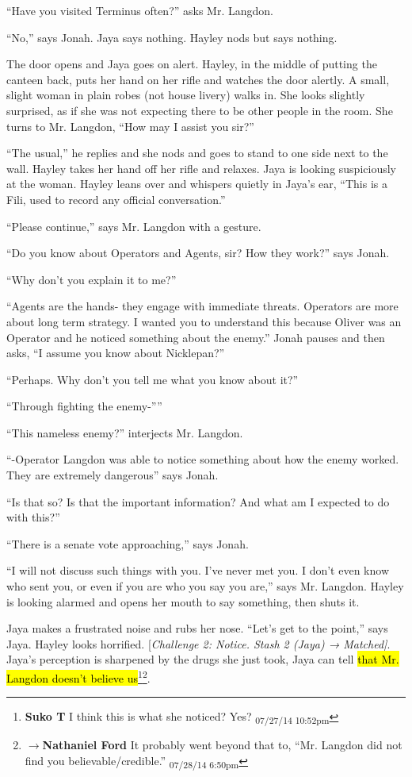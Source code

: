 ``Have you visited Terminus often?'' asks Mr. Langdon.

``No,'' says Jonah.  Jaya says nothing.  Hayley nods but says nothing.

The door opens and Jaya goes on alert.  Hayley, in the middle of putting the canteen back, puts her hand on her rifle and watches the door alertly.  A small, slight woman in plain robes (not house livery) walks in.  She looks slightly surprised, as if she was not expecting there to be other people in the room.  She turns to Mr. Langdon, ``How may I assist you sir?''

``The usual,'' he replies and she nods and goes to stand to one side next to the wall.  Hayley takes her hand off her rifle and relaxes.  Jaya is looking suspiciously at the woman.  Hayley leans over and whispers quietly in Jaya's ear, ``This is a Fili, used to record any official conversation.''

``Please continue,'' says Mr. Langdon with a gesture.

``Do you know about Operators and Agents, sir?  How they work?'' says Jonah.

``Why don't you explain it to me?''

``Agents are the hands- they engage with immediate threats.  Operators are more about long term strategy.   I wanted you to understand this because Oliver was an Operator and he noticed something about the enemy.''  Jonah pauses and then asks, ``I assume you know about Nicklepan?''

``Perhaps.  Why don't you tell me what you know about it?''

``Through fighting the enemy-''''

``This nameless enemy?'' interjects Mr. Langdon.

``-Operator Langdon was able to notice something about how the enemy worked.  They are extremely dangerous'' says Jonah.  

``Is that so?  Is that the important information?  And what am I expected to do with this?''

``There is a senate vote approaching,'' says Jonah.

``I will not discuss such things with you.  I've never met you.  I don't even know who sent you, or even if you are who you say you are,'' says Mr. Langdon.  Hayley is looking alarmed and opens her mouth to say something, then shuts it.

Jaya makes a frustrated noise and rubs her nose.  ``Let's get to the point,'' says Jaya.  Hayley looks horrified.  {[}\textit{Challenge 2:  Notice.  Stash 2 (Jaya) → Matched{]}}.  Jaya's perception is sharpened by the drugs she just took, Jaya can tell \hl{that Mr. Langdon doesn't believe us}\footnote{\textbf{Suko T }I think this is what she noticed?  Yes? \textsubscript{07/27/14 10:52pm}}\footnote{$\rightarrow$\textbf{Nathaniel Ford }It probably went beyond that to, ``Mr. Langdon did not find you believable/credible.'' \textsubscript{07/28/14 6:50pm}}.

